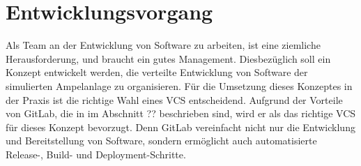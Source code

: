 \section{Entwicklungsvorgang}

Als Team an der Entwicklung von Software zu arbeiten, ist eine ziemliche Herausforderung, und braucht ein gutes Management. Diesbezüglich soll ein Konzept entwickelt werden, die verteilte Entwicklung von Software der simulierten Ampelanlage zu organisieren. 
\newline\newline
Für die Umsetzung dieses Konzeptes in der Praxis ist die richtige Wahl eines VCS entscheidend. Aufgrund der Vorteile von GitLab, die in im Abschnitt {\LARGE ??} beschrieben sind, wird er als das richtige VCS für dieses Konzept bevorzugt. Denn GitLab vereinfacht nicht nur die Entwicklung und Bereitstellung von Software, sondern ermöglicht auch automatisierte Release-, Build- und Deployment-Schritte.
